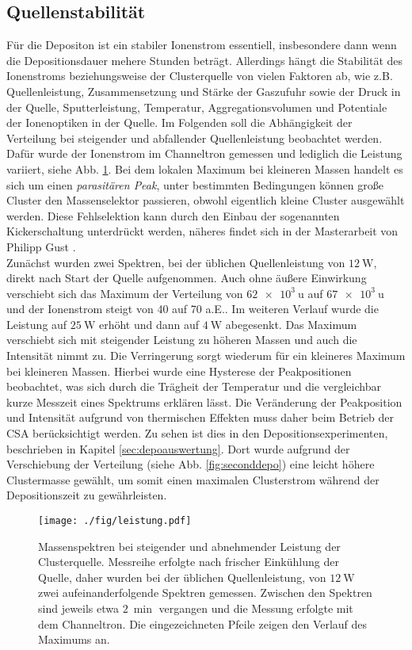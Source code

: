 \subsection{Quellenstabilität}
\label{sec:leistung}
Für die Depositon ist ein stabiler Ionenstrom essentiell, insbesondere dann wenn die Depositionsdauer mehere Stunden beträgt.
Allerdings hängt die Stabilität des Ionenstroms beziehungsweise der Clusterquelle von vielen Faktoren ab, wie z.B. Quellenleistung, Zusammensetzung und Stärke der Gaszufuhr sowie der Druck in der Quelle, Sputterleistung, Temperatur, Aggregationsvolumen und Potentiale der Ionenoptiken in der Quelle.
Im Folgenden soll die Abhängigkeit der Verteilung bei steigender und abfallender Quellenleistung beobachtet werden.
Dafür wurde der Ionenstrom im Channeltron gemessen und lediglich die Leistung variiert, siehe Abb. \ref{fig:leistung}.
Bei dem lokalen Maximum bei kleineren Massen handelt es sich um einen \textit{parasitären Peak}, unter bestimmten Bedingungen können große Cluster den Massenselektor passieren, obwohl eigentlich kleine Cluster ausgewählt werden.
Diese Fehlselektion kann durch den Einbau der sogenannten Kickerschaltung unterdrückt werden, näheres findet sich in der Masterarbeit von Philipp Gust \cite{gust}.\\
Zunächst wurden zwei Spektren, bei der üblichen Quellenleistung von $\SI{12}{\watt}$, direkt nach Start der Quelle aufgenommen. 
Auch ohne äußere Einwirkung verschiebt sich das Maximum der Verteilung von $\SI{62e3}{\amu}$ auf $\SI{67e3}{\amu}$ und der Ionenstrom steigt von 40 auf 70 a.E..
Im weiteren Verlauf wurde die Leistung auf $\SI{25}{\watt}$ erhöht und dann auf $\SI{4}{\watt}$ abegesenkt.
Das Maximum verschiebt sich mit steigender Leistung zu höheren Massen und auch die Intensität nimmt zu.
Die Verringerung sorgt wiederum für ein kleineres Maximum bei kleineren Massen.
Hierbei wurde eine Hysterese der Peakpositionen beobachtet, was sich durch die Trägheit der Temperatur und die vergleichbar kurze Messzeit eines Spektrums erklären lässt.
Die Veränderung der Peakposition und Intensität aufgrund von thermischen Effekten muss daher beim Betrieb der CSA berücksichtigt werden.
Zu sehen ist dies in den Depositionsexperimenten, beschrieben in Kapitel \ref{sec:depoauswertung}.
Dort wurde aufgrund der Verschiebung der Verteilung (siehe Abb. \ref{fig:seconddepo}) eine leicht höhere Clustermasse gewählt, um somit einen maximalen Clusterstrom während der Depositionszeit zu gewährleisten.
\begin{figure}
  \centering
  \texttt{[image: ./fig/leistung.pdf]}
  \caption{Massenspektren bei steigender und abnehmender Leistung der Clusterquelle. Messreihe erfolgte nach frischer Einkühlung der Quelle, daher wurden bei der üblichen Quellenleistung, von $\SI{12}{\watt}$ zwei aufeinanderfolgende Spektren gemessen. Zwischen den Spektren sind jeweils etwa $\SI{2}{\min}$ vergangen und die Messung erfolgte mit dem Channeltron. Die eingezeichneten Pfeile zeigen den Verlauf des Maximums an.}
  \label{fig:leistung}
\end{figure}
